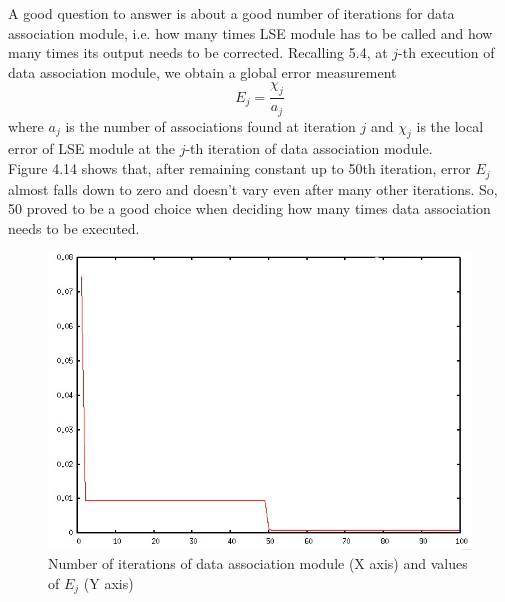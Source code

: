 \documentclass[a4paper, onecolumn]{report}
\begin{document}
A good question to answer is about a good number of iterations for data association module, i.e. how many times LSE module has to be called and how many times its output needs to be corrected. 
Recalling 5.4, at $j$-th execution of data association module, we obtain a global error measurement
\begin{equation}
	E_j = \frac{\chi_{j}}{a_j}
\end{equation}
where $a_j$ is the number of associations found at iteration $j$ and $\chi_{j}$ is the local error of LSE module at the $j$-th iteration of data association module. \\
Figure 4.14 shows that, after remaining constant up to 50th iteration, error $E_j$ almost falls down to zero and doesn't vary even after many other iterations. So, 50 proved to be a good choice when deciding how many times data association needs to be executed. 
\begin{figure}[htbp]
\centering
\includegraphics[width=1.0\textwidth]{images/chi.jpeg}
\caption{Number of iterations of data association module (X axis) and values of $E_j$ (Y axis)}
\end{figure}


\listoffigures
\end{document}
